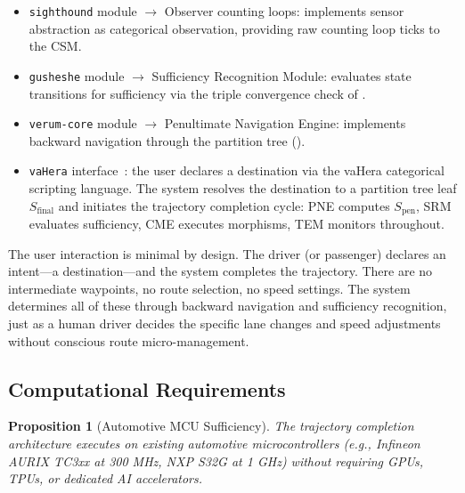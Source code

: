 \documentclass[twocolumn,10pt]{article}
\newtheorem{proposition}[theorem]{Proposition}
\theoremstyle{definition}
\newcommand{\Sfinal}{S_{\mathrm{final}}}
\newcommand{\Spen}{S_{\mathrm{pen}}}
\begin{document}
\begin{itemize}[leftmargin=*]
\item \texttt{sighthound} module $\to$ Observer counting loops: implements sensor abstraction as categorical observation, providing raw counting loop ticks to the CSM.
\item \texttt{gusheshe} module $\to$ Sufficiency Recognition Module: evaluates state transitions for sufficiency via the triple convergence check of .
\item \texttt{verum-core} module $\to$ Penultimate Navigation Engine: implements backward navigation through the partition tree ().
\item \texttt{vaHera} interface~\cite{sachikonye2026vahera,sachikonye2026zangalewa}: the user declares a destination via the vaHera categorical scripting language. The system resolves the destination to a partition tree leaf $\Sfinal$ and initiates the trajectory completion cycle: PNE computes $\Spen$, SRM evaluates sufficiency, CME executes morphisms, TEM monitors throughout.
\end{itemize}

The user interaction is minimal by design. The driver (or passenger) declares an intent---a destination---and the system completes the trajectory. There are no intermediate waypoints, no route selection, no speed settings. The system determines all of these through backward navigation and sufficiency recognition, just as a human driver decides the specific lane changes and speed adjustments without conscious route micro-management.

\subsection{Computational Requirements}

\begin{proposition}[Automotive MCU Sufficiency]
\label{prop:mcu}
The trajectory completion architecture executes on existing automotive microcontrollers (e.g., Infineon AURIX TC3xx at 300 MHz, NXP S32G at 1 GHz) without requiring GPUs, TPUs, or dedicated AI accelerators.
\end{proposition}
\end{document}
